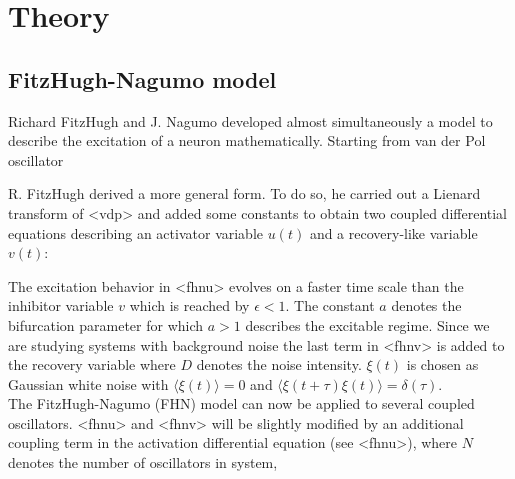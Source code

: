 \section{Theory}
\subsection{FitzHugh-Nagumo model}

Richard FitzHugh \cite{FitzHugh1961} and J. Nagumo \cite{Nagumo1962} developed almost simultaneously a model to describe the excitation of a neuron mathematically. Starting from van der Pol oscillator



R. FitzHugh derived a more general form. To do so, he carried out a Lienard transform\cite{Lienard1928} of \eq<vdp> and added some constants to obtain two coupled differential equations describing an activator variable $u(t)$ and a recovery-like variable $v(t)$: 





The excitation behavior in \eq<fhnu> evolves on a faster time scale than the inhibitor variable $v$ which is reached by $\epsilon < 1$. The constant $a$ denotes the bifurcation parameter for which $a > 1 $ describes the excitable regime. Since we are studying systems with background noise the last term in \eq<fhnv> is added to the recovery variable where $D$ denotes the noise intensity. $\xi (t)$ is chosen as Gaussian white noise with $\langle \xi (t) \rangle = 0$ and $\langle \xi (t + \tau) \xi (t) \rangle = \delta (\tau)$. 
\newline
\\
The FitzHugh-Nagumo (FHN) model can now be applied to several coupled oscillators. \eq<fhnu> and \eq<fhnv> will be slightly modified by an additional coupling term in the activation differential equation (see \eq<fhnu>), where $N$ denotes the number of oscillators in system,

